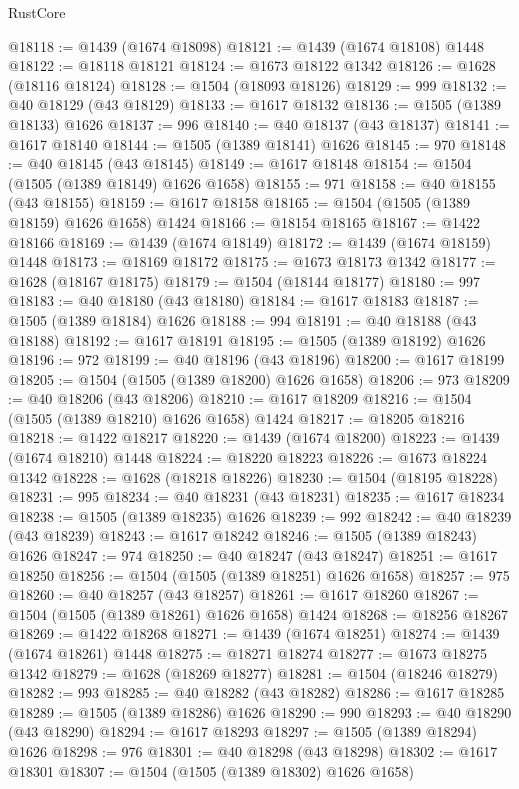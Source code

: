 \begin{lexlean}{RustCore}
\begin{coremodule}
@18118 := @1439 (@1674 @18098)
@18121 := @1439 (@1674 @18108) @1448
@18122 := @18118 @18121
@18124 := @1673 @18122 @1342
@18126 := @1628 (@18116 @18124)
@18128 := @1504 (@18093 @18126)
@18129 := 999
@18132 := @40 @18129 (@43 @18129)
@18133 := @1617 @18132
@18136 := @1505 (@1389 @18133) @1626
@18137 := 996
@18140 := @40 @18137 (@43 @18137)
@18141 := @1617 @18140
@18144 := @1505 (@1389 @18141) @1626
@18145 := 970
@18148 := @40 @18145 (@43 @18145)
@18149 := @1617 @18148
@18154 := @1504 (@1505 (@1389 @18149) @1626 @1658)
@18155 := 971
@18158 := @40 @18155 (@43 @18155)
@18159 := @1617 @18158
@18165 := @1504 (@1505 (@1389 @18159) @1626 @1658) @1424
@18166 := @18154 @18165
@18167 := @1422 @18166
@18169 := @1439 (@1674 @18149)
@18172 := @1439 (@1674 @18159) @1448
@18173 := @18169 @18172
@18175 := @1673 @18173 @1342
@18177 := @1628 (@18167 @18175)
@18179 := @1504 (@18144 @18177)
@18180 := 997
@18183 := @40 @18180 (@43 @18180)
@18184 := @1617 @18183
@18187 := @1505 (@1389 @18184) @1626
@18188 := 994
@18191 := @40 @18188 (@43 @18188)
@18192 := @1617 @18191
@18195 := @1505 (@1389 @18192) @1626
@18196 := 972
@18199 := @40 @18196 (@43 @18196)
@18200 := @1617 @18199
@18205 := @1504 (@1505 (@1389 @18200) @1626 @1658)
@18206 := 973
@18209 := @40 @18206 (@43 @18206)
@18210 := @1617 @18209
@18216 := @1504 (@1505 (@1389 @18210) @1626 @1658) @1424
@18217 := @18205 @18216
@18218 := @1422 @18217
@18220 := @1439 (@1674 @18200)
@18223 := @1439 (@1674 @18210) @1448
@18224 := @18220 @18223
@18226 := @1673 @18224 @1342
@18228 := @1628 (@18218 @18226)
@18230 := @1504 (@18195 @18228)
@18231 := 995
@18234 := @40 @18231 (@43 @18231)
@18235 := @1617 @18234
@18238 := @1505 (@1389 @18235) @1626
@18239 := 992
@18242 := @40 @18239 (@43 @18239)
@18243 := @1617 @18242
@18246 := @1505 (@1389 @18243) @1626
@18247 := 974
@18250 := @40 @18247 (@43 @18247)
@18251 := @1617 @18250
@18256 := @1504 (@1505 (@1389 @18251) @1626 @1658)
@18257 := 975
@18260 := @40 @18257 (@43 @18257)
@18261 := @1617 @18260
@18267 := @1504 (@1505 (@1389 @18261) @1626 @1658) @1424
@18268 := @18256 @18267
@18269 := @1422 @18268
@18271 := @1439 (@1674 @18251)
@18274 := @1439 (@1674 @18261) @1448
@18275 := @18271 @18274
@18277 := @1673 @18275 @1342
@18279 := @1628 (@18269 @18277)
@18281 := @1504 (@18246 @18279)
@18282 := 993
@18285 := @40 @18282 (@43 @18282)
@18286 := @1617 @18285
@18289 := @1505 (@1389 @18286) @1626
@18290 := 990
@18293 := @40 @18290 (@43 @18290)
@18294 := @1617 @18293
@18297 := @1505 (@1389 @18294) @1626
@18298 := 976
@18301 := @40 @18298 (@43 @18298)
@18302 := @1617 @18301
@18307 := @1504 (@1505 (@1389 @18302) @1626 @1658)

\end{coremodule}
\end{lexlean}
